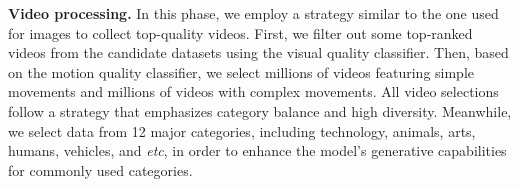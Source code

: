 \textbf{Video processing.}
%
In this phase, we employ a strategy similar to the one used for images to collect top-quality videos. 
%
First, we filter out some top-ranked videos from the candidate datasets using the visual quality classifier. 
%
Then, based on the motion quality classifier, we select millions of videos featuring simple movements and millions of videos with complex movements. 
%
All video selections follow a strategy that emphasizes category balance and high diversity.
%
Meanwhile, we select data from 12 major categories, including technology, animals, arts, humans, vehicles, and \emph{etc}, in order to enhance the model's generative capabilities for commonly used categories.